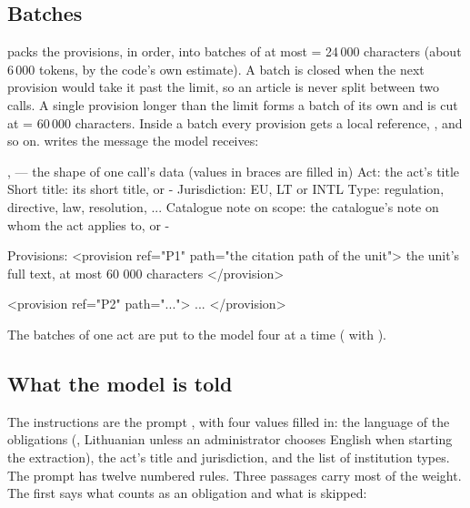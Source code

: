 \subsection{Batches}

 packs the provisions, in order, into batches of at most
 = 24\,000 characters (about 6\,000 tokens, by the code's own estimate). A
batch is closed when the next provision would take it past the limit, so an article is never
split between two calls. A single provision longer than the limit forms a batch of its own and
is cut at  = 60\,000 characters. Inside a batch every provision gets
a local reference, ,  and so on.  writes the message the
model receives:

\begin{codefile}{,  --- the shape of one call's data (values in braces are filled in)}
Act: {the act's title}
Short title: {its short title, or -}
Jurisdiction: {EU, LT or INTL}
Type: {regulation, directive, law, resolution, ...}
Catalogue note on scope: {the catalogue's note on whom the act applies to, or -}

Provisions:
<provision ref="P1" path="{the citation path of the unit}">
{the unit's full text, at most 60 000 characters}
</provision>

<provision ref="P2" path="...">
...
</provision>
\end{codefile}

The batches of one act are put to the model four at a time ( with
).

\subsection{What the model is told}

The instructions are the prompt , with four values filled
in: the language of the obligations (, Lithuanian unless an administrator
chooses English when starting the extraction), the act's title and jurisdiction, and the list
of institution types. The prompt has twelve numbered rules. Three passages carry most of the
weight. The first says what counts as an obligation and what is skipped:

